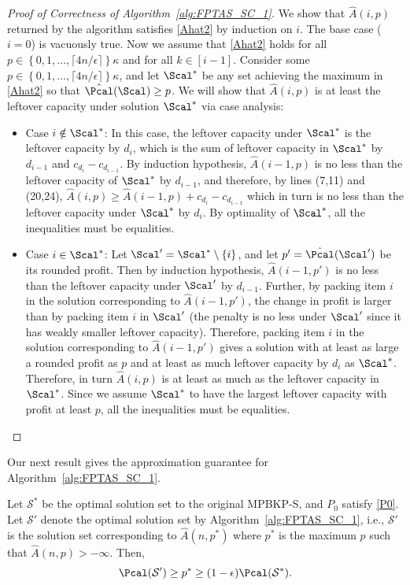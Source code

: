 \begin{proof}[Proof of Correctness of Algorithm~\ref{alg:FPTAS_SC_1}]
	We show that $\hat{A}(i,p)$ returned by the algorithm satisfies \eqref{Ahat2} by induction on $i$. The base case ($i=0$) is vacuously true. Now we assume that \eqref{Ahat2} holds for all $p \in \left\{  0, 1, \ldots, \lceil 4n/\epsilon \rceil \right\}  \kappa$ and for all $k \in [i-1]$. Consider some $p \in \left\{  0, 1, \ldots, \lceil 4n/\epsilon \rceil \right\}  \kappa $, and let $\Scal^*$ be any set achieving the maximum in \eqref{Ahat2} so that $\hat{\Pcal}(\Scal) \ge p$. We will show that $\hat{A}(i,p)$ is at least the leftover capacity under solution $\Scal^*$ via case analysis:
	\begin{itemize}
		\item Case $i \notin \Scal^*$: In this case, the leftover capacity under $\Scal^*$ is the leftover capacity by $d_i$, which is the sum of leftover capacity in $\Scal^*$ by $d_{i-1}$ and $c_{d_i}-c_{d_{i-1}}$. By induction hypothesis, $\hat{A}(i-1,p)$ is no less than the leftover capacity of $\Scal^*$ by $d_{i-1}$, and therefore, by lines (7,11) and (20,24), $\hat{A}(i,p) \geq \hat{A}(i-1,p) + c_{d_i}-c_{d_{i-1}}$ which in turn is no less than the leftover capacity under $\Scal^*$ by $d_i$. By optimality of $\Scal^*$, all the inequalities must be equalities.
		\item Case $i \in \Scal^*$: Let $\Scal' = \Scal^* \setminus \{ i\}$, and let $p' = \hat{\Pcal}(\Scal')$ be its rounded profit. Then by induction hypothesis, $\hat{A}(i-1,p')$ is no less than the leftover capacity under $\Scal'$ by $d_{i-1}$. Further, by packing item $i$ in the solution corresponding to $\hat{A}(i-1,p')$, the change in profit is larger than by packing item $i$ in $\Scal'$ (the penalty is no less under $\Scal'$ since it has weakly smaller leftover capacity). Therefore, packing item $i$ in the solution corresponding to $\hat{A}(i-1,p')$ gives a solution with at least as large a rounded profit as $p$ and at least as much leftover capacity by $d_i$ as $\Scal^*$. Therefore, in turn $\hat{A}(i,p)$ is at least as much as the leftover capacity in $\Scal^*$. Since we assume $\Scal^*$ to have the largest leftover capacity with profit at least $p$, all the inequalities must be equalities.
	\end{itemize}
\end{proof}
Our next result gives the approximation guarantee for Algorithm~\ref{alg:FPTAS_SC_1}.
\begin{lemma}\label{lem:FPTAS-SC}
	Let $\mathcal{S}^*$ be the optimal solution set to the original MPBKP-S, and $P_0$ satisfy \eqref{P0}. Let $\mathcal{S}'$ denote the optimal solution set by Algorithm~\ref{alg:FPTAS_SC_1}, i.e., $\mathcal{S}'$ is the solution set corresponding to $\hat{A}(n,p^*)$ where $p^*$ is the maximum $p$ such that $\hat{A}(n,p)>-\infty$.   Then,
	$$
	\Pcal(\mathcal{S}')\geq p^* \ge (1-\epsilon)\Pcal(\mathcal{S}^*).
	$$
\end{lemma}
